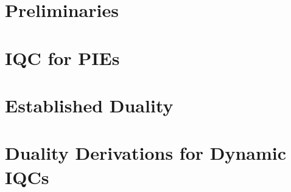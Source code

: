\documentclass[journal,10pt,onecolumn,twoside,a4paper]{IEEEtran}
\begin{document}
\maketitle


\section{Preliminaries}

\section{IQC for PIEs}

\section{Established Duality}\label{sec:genduality}

\section{Duality Derivations for Dynamic IQCs}




  
\vspace{12pt}
\end{document}
